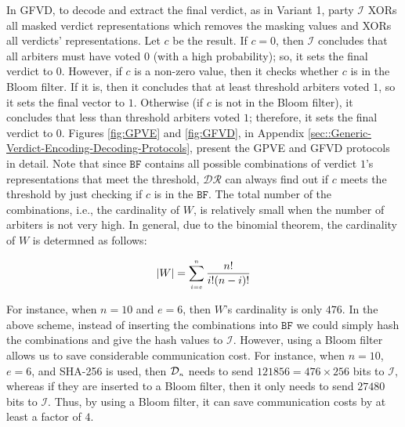 In GFVD, to decode and extract the final verdict, as in Variant 1, party $\mathcal{I}$  XORs all masked verdict representations which  removes the masking values and XORs all verdicts’ representations. Let $c$ be the result.  If $c=0$, then $\mathcal{I}$ concludes that all arbiters must have voted $0$ (with a high probability); so, it sets the final verdict to $0$. However, if $c$ is a non-zero value, then it checks whether $c$ is in the Bloom filter. If it is, then it concludes that at least threshold arbiters voted $1$, so it sets the final vector to $1$. Otherwise (if $c$ is not in the Bloom filter), it concludes that less than threshold arbiters voted $1$; therefore, it sets the final verdict to $0$.  Figures \ref{fig:GPVE} and \ref{fig:GFVD}, in Appendix \ref{sec::Generic-Verdict-Encoding-Decoding-Protocols}, present the  GPVE and GFVD protocols in detail. Note that since $\mathtt{BF}$ contains all possible combinations of verdict $1$'s representations that meet the threshold,  $\mathcal{DR}$ can always find out if $c$ meets the threshold by just checking if $c$ is in the $\mathtt{BF}$. The total number of the combinations, i.e., the cardinality of $W$, is relatively small when the number of arbiters is not very high. In general,  due to the  binomial theorem, the cardinality of $W$ is determned as follows:
%

\begin{equation*}
|W|=\sum\limits_{\scriptscriptstyle i=e}^{\scriptscriptstyle n}\frac{n!}{i!(n- i)!}
 \end{equation*}
 
 For instance, when $n=10$ and $e=6$, then $W$'s cardinality is only $476$.  In the above scheme, instead of inserting the combinations into $\mathtt{BF}$ we could simply hash  the combinations and give the hash values to $\mathcal{I}$. However, using a Bloom filter allows us to save considerable communication cost. For instance, when $n=10$, $e=6$, and SHA-256 is used, then $\mathcal{D}_{\scriptscriptstyle n}$ needs to send  $121856=476\times 256$ bits to $\mathcal{I}$, whereas  if they are inserted to a Bloom filter, then it only needs to send $27480$ bits to $\mathcal{I}$. Thus, by using a Bloom filter,  it  can save  communication costs by at least a factor of  $4$. 
 

 
 




